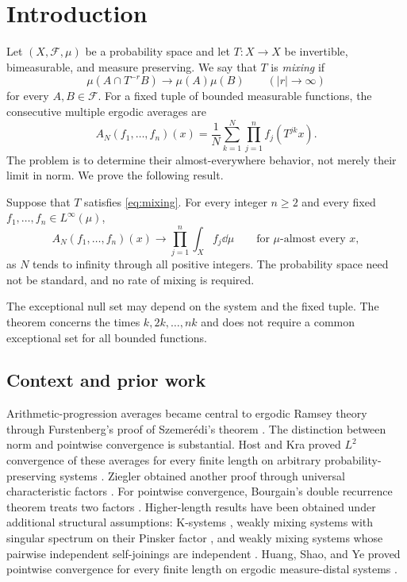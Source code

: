 \section{Introduction}
\label{sec:introduction}

Let $(X,\mathcal F,\mu)$ be a probability space and let $T:X\to X$
be invertible, bimeasurable, and measure preserving. We say that $T$
is \emph{mixing} if
\begin{equation}\label{eq:mixing}
 \mu(A\cap T^{-r}B)\longrightarrow\mu(A)\mu(B)
 \qquad (|r|\to\infty)
\end{equation}
for every $A,B\in\mathcal F$. For a fixed tuple of bounded measurable
functions, the consecutive multiple ergodic averages are
\[
 A_N(f_1,\ldots,f_n)(x)
 =\frac1N\sum_{k=1}^N\prod_{j=1}^n f_j(T^{jk}x).
\]
The problem is to determine their almost-everywhere behavior, not merely
their limit in norm. We prove the following result.

\begin{theorem}\label{thm:main}
Suppose that $T$ satisfies \eqref{eq:mixing}. For every integer
$n\ge2$ and every fixed $f_1,\ldots,f_n\in L^\infty(\mu)$,
\[
 A_N(f_1,\ldots,f_n)(x)
 \longrightarrow\prod_{j=1}^n\int_X f_j\dd\mu
 \qquad\text{for $\mu$-almost every }x,
\]
as $N$ tends to infinity through all positive integers. The probability
space need not be standard, and no rate of mixing is required.
\end{theorem}

The exceptional null set may depend on the system and the fixed tuple.
The theorem concerns the times $k,2k,\ldots,nk$ and does not require
a common exceptional set for all bounded functions.

\subsection{Context and prior work}

Arithmetic-progression averages became central to ergodic Ramsey theory
through Furstenberg's proof of Szemer\'edi's theorem
\cite{Furstenberg1977}. The distinction between norm and pointwise
convergence is substantial. Host and Kra proved $L^2$ convergence of
these averages for every finite length on arbitrary
probability-preserving systems \cite[Theorem~1.1]{HostKra2005}.
Ziegler obtained another proof through universal characteristic
factors \cite[Corollary~1.8]{Ziegler2007}.
For pointwise convergence, Bourgain's double recurrence theorem treats
two factors \cite{Bourgain1990}. Higher-length results have been
obtained under additional structural assumptions: K-systems
\cite[Theorem~4.2]{DerrienLesigne1996}, weakly mixing systems with
singular spectrum on their Pinsker factor \cite{Assani1998}, and
weakly mixing systems whose pairwise independent self-joinings are
independent \cite[Theorem~3.4]{GutmanHuangShaoYe2018}. Huang, Shao,
and Ye proved pointwise convergence for every finite length on
ergodic measure-distal systems \cite[Theorem~C]{HuangShaoYe2019}.

